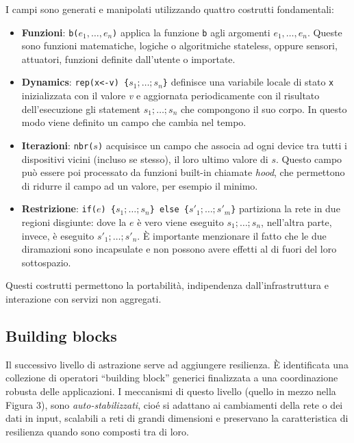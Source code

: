 I campi sono generati e manipolati utilizzando quattro costrutti fondamentali:
\begin{itemize}
\item \textbf{Funzioni}: \texttt{b($e_1,\ldots, e_n$)} applica la funzione \texttt{b}
  agli argomenti \texttt{$e_1,\ldots, e_n$}. Queste sono funzioni matematiche,
  logiche o algoritmiche stateless, oppure sensori, attuatori, funzioni definite
  dall'utente o importate.

\item \textbf{Dynamics}: \texttt{rep(x<-v) \{$s_1;\ldots;s_n$\}} definisce una variabile
  locale di stato \texttt{x} inizializzata con il valore \textit{v} e aggiornata
  periodicamente con il risultato dell'esecuzione gli statement
  \texttt{{$s_1;\ldots;s_n$}} che compongono il suo corpo. In questo modo viene
  definito un campo che cambia nel tempo.

\item \textbf{Iterazioni}: \texttt{nbr($s$)} acquisisce un campo che associa ad ogni
  device tra tutti i dispositivi vicini (incluso se stesso), il loro ultimo
  valore di \texttt{$s$}. Questo campo può essere poi processato da funzioni
  built-in chiamate \textit{hood}, che permettono di ridurre il campo ad un
  valore, per esempio il minimo.

\item \textbf{Restrizione}: \texttt{if($e$) \{$s_1;\ldots;s_n$\} else
    \{$s'_1;\ldots;s'_m$\}} partiziona la rete in due regioni disgiunte: dove la
  \texttt{$e$} è vero viene eseguito \texttt{$s_1;\ldots;s_n$}, nell'altra parte,
  invece, è eseguito \texttt{$s'_1;\ldots;s'_n$}. È importante menzionare il
  fatto che le due diramazioni sono incapsulate e non possono avere effetti al
  di fuori del loro sottospazio.
\end{itemize}

Questi costrutti permettono la portabilità, indipendenza dall'infrastruttura e
interazione con servizi non aggregati.

\subsection{Building blocks}
Il successivo livello di astrazione serve ad aggiungere resilienza. È
identificata una collezione di operatori ``building block'' generici finalizzata
a una coordinazione robusta delle applicazioni. I meccanismi di questo livello
(quello in mezzo nella Figura 3), sono \textit{auto-stabilizzati}, cioé si
adattano ai cambiamenti della rete o dei dati in input, scalabili a reti di
grandi dimensioni e preservano la caratteristica di resilienza quando sono
composti tra di loro\cite{7056345}.


